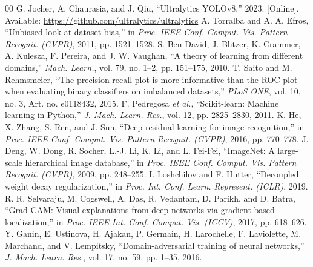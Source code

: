 \documentclass[conference]{IEEEtran}
\begin{document}
\begin{thebibliography}{00}
 G. Jocher, A. Chaurasia, and J. Qiu, ``Ultralytics YOLOv8,'' 2023. [Online]. Available: \url{https://github.com/ultralytics/ultralytics}
 A. Torralba and A. A. Efros, ``Unbiased look at dataset bias,'' in \textit{Proc. IEEE Conf. Comput. Vis. Pattern Recognit. (CVPR)}, 2011, pp. 1521--1528.
 S. Ben-David, J. Blitzer, K. Crammer, A. Kulesza, F. Pereira, and J. W. Vaughan, ``A theory of learning from different domains,'' \textit{Mach. Learn.}, vol. 79, no. 1--2, pp. 151--175, 2010.
 T. Saito and M. Rehmsmeier, ``The precision-recall plot is more informative than the ROC plot when evaluating binary classifiers on imbalanced datasets,'' \textit{PLoS ONE}, vol. 10, no. 3, Art. no. e0118432, 2015.
 F. Pedregosa \textit{et al.}, ``Scikit-learn: Machine learning in Python,'' \textit{J. Mach. Learn. Res.}, vol. 12, pp. 2825--2830, 2011.
 K. He, X. Zhang, S. Ren, and J. Sun, ``Deep residual learning for image recognition,'' in \textit{Proc. IEEE Conf. Comput. Vis. Pattern Recognit. (CVPR)}, 2016, pp. 770--778.
 J. Deng, W. Dong, R. Socher, L.-J. Li, K. Li, and L. Fei-Fei, ``ImageNet: A large-scale hierarchical image database,'' in \textit{Proc. IEEE Conf. Comput. Vis. Pattern Recognit. (CVPR)}, 2009, pp. 248--255.
 I. Loshchilov and F. Hutter, ``Decoupled weight decay regularization,'' in \textit{Proc. Int. Conf. Learn. Represent. (ICLR)}, 2019.
 R. R. Selvaraju, M. Cogswell, A. Das, R. Vedantam, D. Parikh, and D. Batra, ``Grad-CAM: Visual explanations from deep networks via gradient-based localization,'' in \textit{Proc. IEEE Int. Conf. Comput. Vis. (ICCV)}, 2017, pp. 618--626.
 Y. Ganin, E. Ustinova, H. Ajakan, P. Germain, H. Larochelle, F. Laviolette, M. Marchand, and V. Lempitsky, ``Domain-adversarial training of neural networks,'' \textit{J. Mach. Learn. Res.}, vol. 17, no. 59, pp. 1--35, 2016.
\end{thebibliography}
\end{document}
